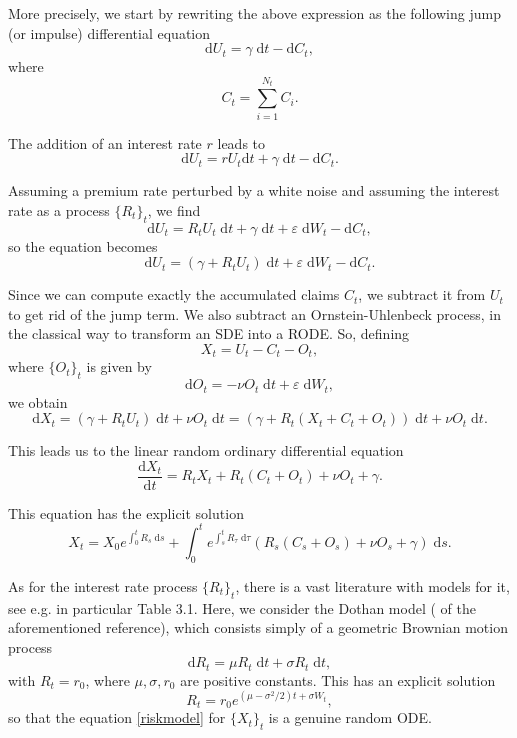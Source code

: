 \documentclass[reqno,12pt]{amsart}
\theoremstyle{plain} %
\theoremstyle{definition} %
\begin{document}
More precisely, we start by rewriting the above expression as the following jump (or impulse) differential equation
\[
  \mathrm{d}U_t = \gamma\;\mathrm{d}t - \mathrm{d}C_t,
\]
where
\[
  C_t = \sum_{i=1}^{N_t} C_i.
\]

The addition of an interest rate $r$ leads to
\[
  \mathrm{d}U_t = r U_t \mathrm{d}t + \gamma\;\mathrm{d}t - \mathrm{d}C_t.
\]

Assuming a premium rate perturbed by a white noise and assuming the interest rate as a process $\{R_t\}_t$, we find
\[
  \mathrm{d}U_t = R_t U_t\;\mathrm{d}t + \gamma\;\mathrm{d}t + \varepsilon\;\mathrm{d}W_t - \mathrm{d}C_t,
\]
so the equation becomes
\[
  \mathrm{d}U_t = (\gamma + R_t U_t)\;\mathrm{d}t + \varepsilon\;\mathrm{d}W_t - \mathrm{d}C_t.
\]

Since we can compute exactly the accumulated claims $C_t$, we subtract it from $U_t$ to get rid of the jump term. We also subtract an Ornstein-Uhlenbeck process, in the classical way to transform an SDE into a RODE. So, defining
\[
  X_t = U_t - C_t - O_t,
\]
where $\{O_t\}_t$ is given by
\[
  \mathrm{d}O_t = -\nu O_t\;\mathrm{d}t + \varepsilon\;\mathrm{d}W_t,
\]
we obtain
\[
  \mathrm{d}X_t = (\gamma + R_t U_t)\;\mathrm{d}t + \nu O_t\;\mathrm{d}t = (\gamma + R_t (X_t + C_t + O_t))\;\mathrm{d}t + \nu O_t\;\mathrm{d}t.
\]

This leads us to the linear random ordinary differential equation
\begin{equation}
    \label{riskmodel}
    \frac{\mathrm{d}X_t}{\mathrm{d}t} = R_t X_t + R_t (C_t + O_t) + \nu O_t + \gamma.
\end{equation}

This equation has the explicit solution
\[
  X_t = X_0 e^{\int_0^t R_s\;\mathrm{d}s} + \int_0^t e^{\int_s^t R_\tau\;\mathrm{d}\tau} (R_s (C_s + O_s) + \nu O_s + \gamma)\;\mathrm{d}s.
\]

As for the interest rate process $\{R_t\}_t$, there is a vast literature with models for it, see e.g. \cite[Chapter 3]{BrigoMercurio2006} in particular Table 3.1. Here, we consider the Dothan model (\cite[Section 3.2.2]{BrigoMercurio2006} of the aforementioned reference), which consists simply of a geometric Brownian motion process
\[
  \mathrm{d}R_t = \mu R_t \;\mathrm{d}t + \sigma R_t\;\mathrm{d}t,
\]
with $R_t = r_0$, where $\mu, \sigma, r_0$ are positive constants. This has an explicit solution
\[
  R_t = r_0 e^{(\mu - \sigma^2/2)t + \sigma W_t},
\]
so that the equation \eqref{riskmodel} for $\{X_t\}_t$ is a genuine random ODE.
\end{document}
